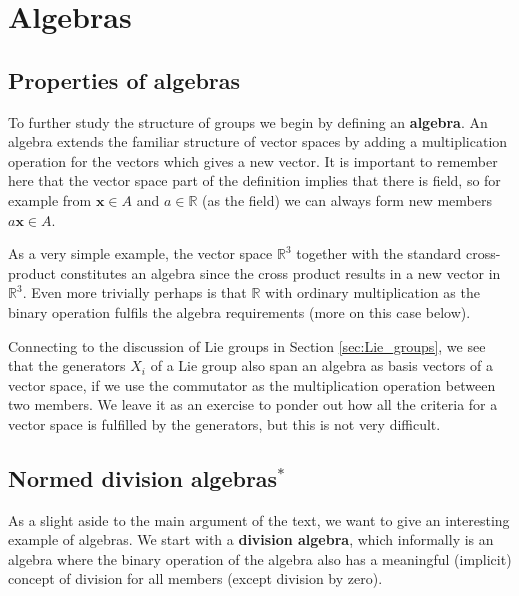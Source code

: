\documentclass[notes.tex]{subfiles}
\begin{document}
\chapter{Algebras}
\label{chap:algebras}

\section{Properties of algebras}
\label{sec:algebras}

To further study the structure of groups we begin by defining an {\bf algebra}. An algebra extends the familiar structure of vector spaces by adding a multiplication operation for the vectors which gives a new vector.
It is important to remember here that the vector space part of the definition implies that there is field, so for example from $\mathbf x\in A$ and $a\in \mathbb{R}$ (as the field) we can always form new members $a\mathbf x\in A$.

As a very simple example, the vector space $\mathbb{R}^3$ together with the standard cross-product constitutes an algebra since the cross product results in a new vector in  $\mathbb{R}^3$. Even more trivially perhaps is that $\mathbb{R}$ with ordinary multiplication as the binary operation fulfils the algebra requirements (more on this case below).

Connecting to the discussion of Lie groups in Section \ref{sec:Lie_groups}, we see that the generators $X_i$ of a Lie group also span an algebra as basis vectors of a vector space, if we use the commutator as  the multiplication operation between two members. We leave it as an exercise to ponder out how all the criteria for a vector space is fulfilled by the generators, but this is not very difficult.


\section{Normed division algebras$^*$}
\label{sec:normed_division_algebras}
As a slight aside to the main argument of the text, we want to give an interesting example of algebras. We start with a {\bf division algebra}, which informally is an algebra where the binary operation of the algebra also has a meaningful (implicit) concept of division for all members (except division by zero).
\end{document}
